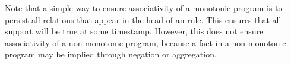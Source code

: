 Note that a simple way to ensure associativity of a monotonic program is to
persist all relations that appear in the head of an  rule.
This ensures that all support will be true at some timestamp.  However, this
does not ensure associativity of a non-monotonic program, because a fact in a
non-monotonic program may be implied through negation or aggregation.





